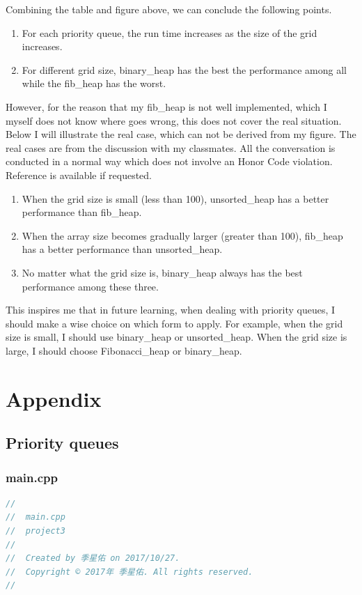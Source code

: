 \documentclass{article}
\begin{document}
\begin{spacing}{2.0}
Combining the table and figure above, we can conclude the following points.
\begin{enumerate}
\item For each priority queue, the run time increases as the size of the grid increases.
\item For different grid size, binary\_heap has the best the performance among all while the fib\_heap has the worst.
\end{enumerate}

\indent However, for the reason that my fib\_heap is not well implemented, which I myself does not know where goes wrong, this does not cover the real situation.\\
\indent Below I will illustrate the real case, which can not be derived from my figure. The real cases are from the discussion with my classmates. All the conversation is conducted in a normal way which does not involve an Honor Code violation. Reference is available if requested.
\begin{enumerate}
\item When the grid size is small (less than 100), unsorted\_heap has a better performance than fib\_heap.
\item When the array size becomes gradually larger (greater than 100), fib\_heap has a better performance than unsorted\_heap.
\item No matter what the grid size is, binary\_heap always has the best performance among these three.
\end{enumerate}

This inspires me that in future learning, when dealing with priority queues, I should make a wise choice on which form to apply. For example, when the grid size is small, I should use binary\_heap or unsorted\_heap. When the grid size is large, I should choose Fibonacci\_heap or binary\_heap.
\section{Appendix}
\subsection{Priority queues}
\subsubsection{main.cpp}
\begin{lstlisting}[language=c++]
//
//  main.cpp
//  project3
//
//  Created by 季星佑 on 2017/10/27.
//  Copyright © 2017年 季星佑. All rights reserved.
//


\end{lstlisting}
\end{spacing}
\end{document}
